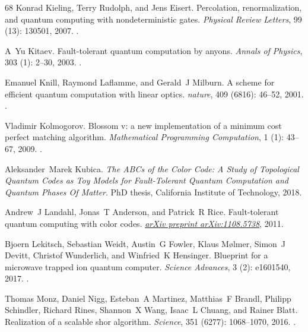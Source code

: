 \documentclass[a4paper, 10pt, accepted=2021-11-03]{quantumarticle}
\begin{document}
{\begin{thebibliography}{68}
Konrad Kieling, Terry Rudolph, and Jens Eisert.
\newblock Percolation, renormalization, and quantum computing with
  nondeterministic gates.
\newblock \emph{Physical Review Letters}, 99 (13): 130501,
  2007.
\newblock {}.

A~Yu Kitaev.
\newblock Fault-tolerant quantum computation by anyons.
\newblock \emph{Annals of Physics}, 303 (1): 2--30, 2003.
\newblock {}.

Emanuel Knill, Raymond Laflamme, and Gerald~J Milburn.
\newblock A scheme for efficient quantum computation with linear optics.
\newblock \emph{nature}, 409 (6816): 46--52, 2001.
\newblock {}.

Vladimir Kolmogorov.
\newblock Blossom v: a new implementation of a minimum cost perfect matching
  algorithm.
\newblock \emph{Mathematical Programming Computation}, 1 (1):
  43--67, 2009.
\newblock {}.

Aleksander~Marek Kubica.
\newblock \emph{The ABCs of the Color Code: A Study of Topological Quantum
  Codes as Toy Models for Fault-Tolerant Quantum Computation and Quantum Phases
  Of Matter}.
\newblock PhD thesis, California Institute of Technology, 2018.

Andrew~J Landahl, Jonas~T Anderson, and Patrick~R Rice.
\newblock Fault-tolerant quantum computing with color codes.
\newblock \emph{\href{https://arxiv.org/abs/1108.5738}{arXiv preprint
  arXiv:1108.5738}}, 2011.

Bjoern Lekitsch, Sebastian Weidt, Austin~G Fowler, Klaus M{\o}lmer, Simon~J
  Devitt, Christof Wunderlich, and Winfried~K Hensinger.
\newblock Blueprint for a microwave trapped ion quantum computer.
\newblock \emph{Science Advances}, 3 (2): e1601540, 2017.
\newblock {}.

Thomas Monz, Daniel Nigg, Esteban~A Martinez, Matthias~F Brandl, Philipp
  Schindler, Richard Rines, Shannon~X Wang, Isaac~L Chuang, and Rainer Blatt.
\newblock Realization of a scalable shor algorithm.
\newblock \emph{Science}, 351 (6277): 1068--1070, 2016.
\newblock {}.


\end{thebibliography}}
\end{document}
